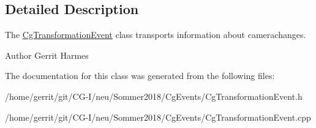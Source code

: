 \subsection{Detailed Description}
The \hyperlink{class_cg_transformation_event}{Cg\+Transformation\+Event} class transports information about camerachanges. 

\begin{DoxyAuthor}{Author}
Gerrit Harmes 
\end{DoxyAuthor}


The documentation for this class was generated from the following files\+:\begin{DoxyCompactItemize}
\item 
/home/gerrit/git/\+C\+G-\/\+I/neu/\+Sommer2018/\+Cg\+Events/Cg\+Transformation\+Event.\+h\item 
/home/gerrit/git/\+C\+G-\/\+I/neu/\+Sommer2018/\+Cg\+Events/Cg\+Transformation\+Event.\+cpp\end{DoxyCompactItemize}
